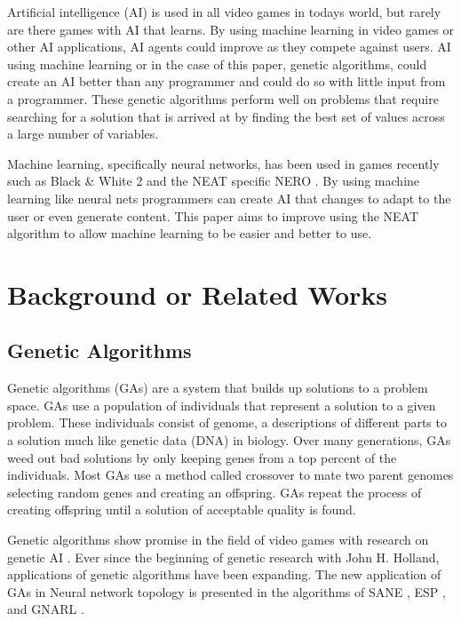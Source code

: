 \documentclass[12pt]{ucthesis} \newif\ifpdf \ifx\pdfoutput\undefined
\begin{document}
Artificial intelligence (AI) is used in all video games in todays world, but
rarely are there games with AI that learns. By using machine learning in video
games or other AI applications, AI agents could improve as they compete against
users.
AI using machine learning or in the case of this paper, genetic algorithms, could
create an AI better than any programmer and could do so with little input from a
programmer. These genetic algorithms perform well on problems that require
searching for a solution that is arrived at by finding the best set of values
across a large number of variables.

Machine learning, specifically neural networks, has been used in games recently
such as Black & White 2 and the NEAT specific NERO \cite{hastings2009evolving}.
By using machine learning like neural nets programmers can create AI that
changes to adapt to the user or even generate content. This paper aims to
improve using the NEAT algorithm to allow machine learning to be easier and
better to use. 
 

\chapter{Background or Related Works}


\section{Genetic Algorithms}

Genetic algorithms (GAs) are a system that builds up solutions to a problem
space. GAs use a population of individuals that represent a solution to a given
problem. These individuals consist of genome, a descriptions of different parts
to a solution much like genetic data (DNA) in biology. Over many generations,
GAs weed out bad solutions by only keeping genes from a top percent of the
individuals. Most GAs use a method called crossover to mate two parent genomes
selecting random genes and creating an offspring. GAs repeat the process of
creating offspring until a solution of acceptable quality is found.

Genetic algorithms show promise in the field of video games with research on
genetic AI \cite{Revello,PengHuo,Chih-Sheng}. Ever since the beginning of
genetic research with John H. Holland, applications of genetic algorithms have
been expanding. The new application of GAs in Neural network topology is
presented in the algorithms of SANE \cite{moriarty:focus} , ESP
\cite{gomez:proposal} , and GNARL \cite{Angeline}.
\end{document}
